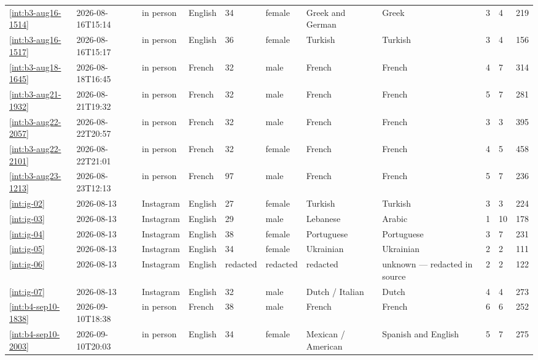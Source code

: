 \begin{landscape}
\begin{longtable}{@{}p{2.2cm}p{2.0cm}p{1.6cm}p{1.4cm}p{0.8cm}p{1.3cm}p{2.4cm}p{1.8cm}p{0.6cm}p{0.6cm}p{1.0cm}@{}}
\ref{int:b3-aug16-1514} & 2026-08-16T15:14 & in person & English & 34 & female & Greek and German & Greek & 3 & 4 & 219 \\
\ref{int:b3-aug16-1517} & 2026-08-16T15:17 & in person & English & 36 & female & Turkish & Turkish & 3 & 4 & 156 \\
\ref{int:b3-aug18-1645} & 2026-08-18T16:45 & in person & French & 32 & male & French & French & 4 & 7 & 314 \\
\ref{int:b3-aug21-1932} & 2026-08-21T19:32 & in person & French & 32 & male & French & French & 5 & 7 & 281 \\
\ref{int:b3-aug22-2057} & 2026-08-22T20:57 & in person & French & 32 & male & French & French & 3 & 3 & 395 \\
\ref{int:b3-aug22-2101} & 2026-08-22T21:01 & in person & French & 32 & female & French & French & 4 & 5 & 458 \\
\ref{int:b3-aug23-1213} & 2026-08-23T12:13 & in person & French & 97 & male & French & French & 5 & 7 & 236 \\
\ref{int:ig-02} & 2026-08-13 & Instagram & English & 27 & female & Turkish & Turkish & 3 & 3 & 224 \\
\ref{int:ig-03} & 2026-08-13 & Instagram & English & 29 & male & Lebanese & Arabic & 1 & 10 & 178 \\
\ref{int:ig-04} & 2026-08-13 & Instagram & English & 38 & female & Portuguese & Portuguese & 3 & 7 & 231 \\
\ref{int:ig-05} & 2026-08-13 & Instagram & English & 34 & female & Ukrainian & Ukrainian & 2 & 2 & 111 \\
\ref{int:ig-06} & 2026-08-13 & Instagram & English & redacted & redacted & redacted & unknown — redacted in source & 2 & 2 & 122 \\
\ref{int:ig-07} & 2026-08-13 & Instagram & English & 32 & male & Dutch / Italian & Dutch & 4 & 4 & 273 \\
\ref{int:b4-sep10-1838} & 2026-09-10T18:38 & in person & French & 38 & male & French & French & 6 & 6 & 252 \\
\ref{int:b4-sep10-2003} & 2026-09-10T20:03 & in person & English & 34 & female & Mexican / American & Spanish and English & 5 & 7 & 275 \\
\end{longtable}
\end{landscape}
